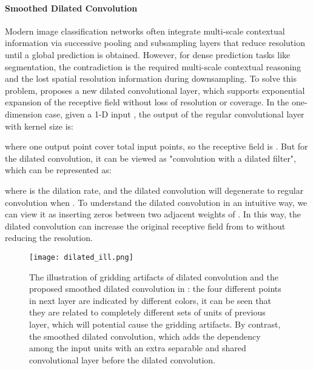\documentclass[10pt,twocolumn,letterpaper]{article}
\begin{document}
\paragraph{Smoothed Dilated Convolution}Modern image classification networks \cite{krizhevsky2012imagenet,szegedy2015going,he2016deep} often integrate multi-scale contextual information via successive pooling and subsampling layers that reduce resolution until a global prediction is obtained. However, for dense prediction tasks like segmentation, the contradiction is the required multi-scale  contextual reasoning and the lost spatial resolution information during downsampling. To solve this problem, \cite{yu2015multi} proposes a new dilated convolutional layer, which supports exponential expansion of the receptive field without loss of resolution or coverage. In the one-dimension case, given a 1-D input , the output of the regular convolutional layer  with kernel size  is:

where one output point cover total  input points, so the receptive field is . But for the dilated convolution, it can be viewed as "convolution with a dilated filter", which can be represented as:

where  is the dilation rate, and the dilated convolution will degenerate to regular convolution when . To understand the dilated convolution in an intuitive way, we can view it as inserting  zeros between two adjacent weights of . In this way, the dilated convolution can increase the original receptive field from  to  without reducing the resolution.

\begin{figure}[t]
	\centering \texttt{[image: dilated\_ill.png]}
\caption{The illustration of gridding artifacts of dilated convolution and the proposed smoothed dilated convolution in  \cite{wang2018smoothed}: the four different points in next layer  are indicated by different colors, it can be seen that they are related to completely different sets of units of previous layer, which will potential cause  the gridding artifacts. By contrast,  the smoothed dilated convolution, which adds the dependency among the input units with an extra separable and shared convolutional layer before the dilated convolution.}
	\label{fg:dilated_grid}
\end{figure}
\end{document}
